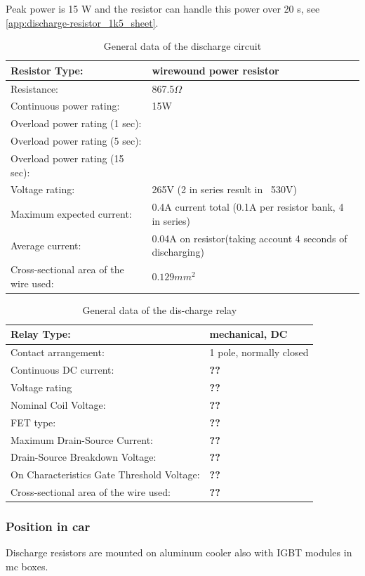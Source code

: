 Peak power is 15 W and the resistor can handle this power over 20 s, see \ref{app:discharge-resistor_1k5_sheet}.

\begin{table}[H]
	\centering
	\caption{General data of the discharge circuit}
	\begin{tabularx}{\textwidth}{|X|X|}
		\hline
		Resistor Type: & wirewound power resistor \\[\TableSize]
		\hline
		Resistance: & 867.5$\Omega$ \\[\TableSize]
		\hline
		Continuous power rating: & 15W \\[\TableSize]
		\hline
		Overload power rating (1 sec): & \\[\TableSize]
		\hline
		Overload power rating (5 sec): &  \\[\TableSize]
		\hline
		Overload power rating (15 sec): &  \\[\TableSize]
		\hline
		Voltage rating: & 265V (2 in series result in ~530V) \\[\TableSize]
		\hline
		Maximum expected current: & 0.4A current total (0.1A per resistor bank, 4 in series) \\[\TableSize]
		\hline
		Average current: & 0.04A on resistor(taking account 4 seconds of discharging) \\[\TableSize]
		\hline
		Cross-sectional area of the wire used: & $0.129 mm^2$ \\[\TableSize]
		\hline
	\end{tabularx}%
	\label{tab:dischrage-circ}%
\end{table}%

\begin{table}[H]
	\centering
	\caption{General data of the dis-charge relay}
	\begin{tabularx}{\textwidth}{|X|X|}
		\hline
		Relay Type: & mechanical, DC \\[\TableSize]
		\hline
		Contact arrangement: & 1 pole, normally closed  \\[\TableSize]
		\hline
		Continuous DC current:  & \textbf{??}  \\[\TableSize]
		\hline
		Voltage rating  & \textbf{??}\\[\TableSize]
		\hline
		Nominal Coil Voltage: & \textbf{??}\\[\TableSize]
		\hline
		FET type: & \textbf{??} \\[\TableSize]
		\hline
		Maximum Drain-Source Current: & \textbf{??}  \\[\TableSize]
		\hline
		Drain-Source Breakdown Voltage: & \textbf{??}  \\[\TableSize]
		\hline
		On Characteristics Gate Threshold Voltage: & \textbf{??} \\[\TableSize]
		\hline
		Cross-sectional area of the wire used: & \textbf{??} \\[\TableSize]
		\hline
	\end{tabularx}%
	\label{tab:discharge-relay}%
\end{table}%


\subsubsection{Position in car}

Discharge resistors are mounted on aluminum cooler also with IGBT modules in \gls{mc} boxes.